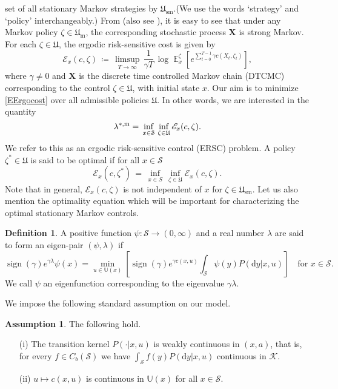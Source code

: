 \documentclass[notitlepage,11pt,reqno]{amsart}
\numberwithin{equation}{section}
\theoremstyle{plain}
\theoremstyle{definition}
\newtheorem{assumption}{Assumption}[section]
\newtheorem{definition}{Definition}[section]
\theoremstyle{remark}
\newcommand{\Act}{{\mathds{U}}}
\newcommand{\Cc}{{C}}               %
\newcommand{\sE}{{\mathscr{E}}}     %
\newcommand{\sK}{{\mathscr{K}}}
\newcommand{\cS}{{\mathcal{S}}}     %
\newcommand{\Uadm}{\mathfrak{U}}
\newcommand{\Um}{\mathfrak{U}_{\mathrm{m}}}
\newcommand{\Usm}{\mathfrak{U}_{\mathrm{sm}}}
\newcommand{\lamstrdm}{\lambda^{*,{\rm m}}}
\DeclareMathOperator{\Exp}{\mathbb{E}} %
\newcommand{\D}{\mathrm{d}} %
\DeclareMathOperator*{\sgn}{sign}
\newcommand{\df}{\coloneqq}
\begin{document}
set of all stationary Markov strategies by $\Usm$.(We use the words `strategy' and `policy' interchangeably.)  From \cite[p.6]{H89} (also see \cite{ABFGM93}), it is easy to see that under any Markov policy $\zeta\in\Um$, the corresponding stochastic process $\textbf{X}$ is strong Markov. For each $\zeta\in\Uadm$, the ergodic risk-sensitive cost is given by
\begin{equation}\label{EErgocost}
\sE_x(c, \zeta) \,\df\, \limsup_{ T\to\infty} \, \frac{1}{\gamma T}\,
\log \Exp_x^{\zeta} \left[e^{\sum_{t = 0}^{T-1} \gamma c(X_t, \zeta_t)}\right],
\end{equation}
where $\gamma\neq 0$ and $\textbf{X}$ is the discrete time controlled Markov chain (DTCMC)
corresponding to the control $\zeta\in\Uadm$, with initial state $x$.
Our aim is to minimize \cref{EErgocost} over all admissible policies $\Uadm$. In other words,
we are interested in the quantity
\begin{equation}\label{lamstr-DMC}
\lamstrdm= \, \inf_{x\in \cS}\, \inf_{\zeta\in \Uadm}\sE_x(c, \zeta).
\end{equation}
We refer to this as an ergodic risk-sensitive control (ERSC) problem.
A policy $\zeta^{*}\in \Uadm$ is said to be optimal if for all $x\in\cS$
$$\sE_x(c,\zeta^{*}) \, = \, \inf_{x\in S}\,\inf_{\zeta\in \Uadm}\sE_x(c, \zeta).$$
Note that in general,  $\sE_x(c,\zeta)$ is not independent of 
$x$ for $\zeta\in\Usm$. Let us also mention the optimality 
equation which will be important for characterizing the optimal stationary
Markov controls.
\begin{definition}\label{A2.1}
A positive function $\psi:\cS\to (0, \infty)$ and a real number
$\lambda$ are said to form an eigen-pair $(\psi, \lambda)$ if
\begin{equation}\label{ED2.1}
\sgn(\gamma)e^{\gamma\lambda}\psi(x) = \min_{u\in\Act(x)}\left[\sgn(\gamma)e^{\gamma c(x,u)}\int_{\cS} \psi(y)P(\D{y}|x,u)\right]\quad\text{for}\,\, x\in \cS.
\end{equation}
We call $\psi$ an eigenfunction corresponding to the eigenvalue
$\gamma\lambda$.
\end{definition}
We impose the following standard assumption on our model.
\begin{assumption}
The following hold.
\begin{itemize}
\item[(i)] The transition kernel $P(\cdot| x, u)$ is weakly continuous in
$(x, a)$, that is, for every $f\in\Cc_b(\cS)$ we have 
$\int_{\cS} f(y)P(\D{y}|x, u)$ continuous in $\sK$.

\item[(ii)] $u\mapsto c(x, u)$ is continuous in $\Act(x)$ for all $x\in\cS$.
\end{itemize}
\end{assumption}
\end{document}
